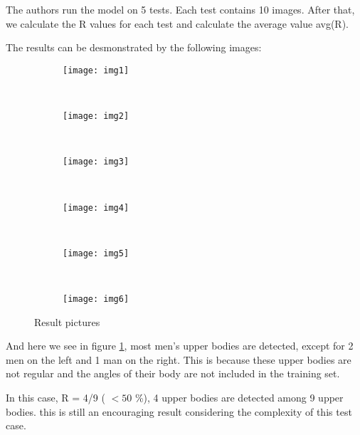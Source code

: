 The authors run the model on 5 tests. Each test contains 10 images. After that, we calculate the R values for each test and calculate the average value avg(R).

The results can be desmonstrated by the following images:
\begin{figure*}[h]
	\centering
	\begin{subfigure}[b]{0.3\textwidth}
		\texttt{[image: img1]}
		\caption{}
		\label{fig:res1}
	\end{subfigure}
	~
	\begin{subfigure}[b]{0.3\textwidth}
		\texttt{[image: img2]}
		\caption{}
		\label{fig:res2}
	\end{subfigure}
	~ %
	\begin{subfigure}[b]{0.3\textwidth}
		\texttt{[image: img3]}
		\caption{}
		\label{fig:res3}
	\end{subfigure}
	~ %
	\begin{subfigure}[b]{0.3\textwidth}
		\texttt{[image: img4]}
		\caption{}
		\label{fig:res4}
	\end{subfigure}
	~
	\begin{subfigure}[b]{0.3\textwidth}
		\texttt{[image: img5]}
		\caption{}
		\label{fig:res5}
	\end{subfigure}
	~
	\begin{subfigure}[b]{0.3\textwidth}
		\texttt{[image: img6]}
		\caption{}
		\label{fig:res6}
	\end{subfigure}
	\caption{Result pictures}\label{fig:animals}
\end{figure*}

And here we see in figure \ref{fig:res1}, most men's upper bodies are detected, except for 2 men on the left and 1 man on the right. This is because these upper bodies are not regular and the angles of their body are not included in the training set. 

In this case, R = 4/9 ( \(<50\) \%), 4 upper bodies are detected among 9 upper bodies.
this is still an encouraging result considering the complexity of this test case.


